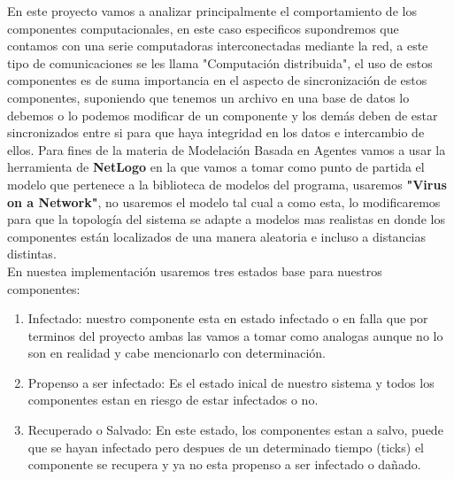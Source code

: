 \documentclass[12pt]{article}
\begin{document}
En este proyecto vamos a analizar principalmente el comportamiento de los componentes computacionales, en este caso especificos supondremos que contamos con una serie computadoras interconectadas mediante la red, a este tipo de comunicaciones se les llama "Computación distribuida", el uso de estos componentes es de suma importancia en el aspecto de 
sincronización de estos componentes, suponiendo que tenemos un archivo en una base de datos lo debemos o lo podemos modificar de un componente y los demás deben de estar sincronizados entre si para que haya integridad en los datos e intercambio de ellos.
Para fines de la materia de Modelación Basada en Agentes vamos a usar la herramienta de \textbf{NetLogo} en la que vamos a tomar como punto de partida el modelo que pertenece a la biblioteca de modelos del programa, usaremos \textbf{"Virus on a
Network"}, no usaremos el modelo tal cual a como esta, lo modificaremos para que la topología del sistema se adapte a modelos mas realistas en donde los componentes están localizados de una manera aleatoria e incluso a distancias distintas.\\
En nuestea implementación usaremos tres estados base para nuestros componentes:\\
\begin{enumerate}
    \item Infectado: nuestro componente esta en estado infectado o en falla que por terminos del proyecto ambas las vamos a tomar como analogas aunque no lo son en realidad y cabe mencionarlo con determinación.
    \item Propenso a ser infectado: Es el estado inical de nuestro sistema y todos los componentes estan en riesgo de estar infectados o no.
    \item Recuperado o Salvado: En este estado, los componentes estan a salvo, puede que se hayan infectado pero despues de un determinado tiempo (ticks) el componente se recupera y ya no esta propenso a ser infectado o dañado. 
\end{enumerate}
\end{document}
